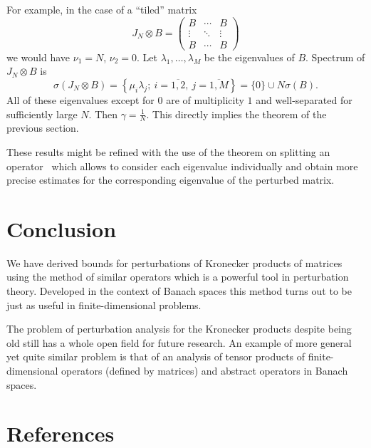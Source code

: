 \documentclass[a4paper]{jpconf}
\begin{document}
For example, in the case of a ``tiled'' matrix
\[
    J_N{\otimes}B =
    \begin{pmatrix}
        B & \cdots & B \\
        \vdots & \ddots & \vdots \\
        B & \cdots & B
    \end{pmatrix}
\]
    we would have
    \( \nu_1=N \),
    \( \nu_2=0 \).
Let \( \lambda_1,\ldots,\lambda_M \)
    be the eigenvalues of \( B \).
Spectrum of \( J_N{\otimes}B \) is
    \[
        \sigma(J_N{\otimes}B) = \left\{ \mu_i\lambda_j;\ i{=}\overline{1,2},\ j{=}\overline{1,M}\right\} = \{0\}\cup N\sigma(B).
    \]
All of these eigenvalues except for \( 0 \)
    are of multiplicity \( 1 \)
    and well-separated for sufficiently large \( N \).
Then \( \gamma=\frac1N \).
This directly implies the theorem of the previous section.

These results might be refined
    with the use of the theorem on splitting an operator~\cite{baskakov1987theorem}
    which allows to consider each eigenvalue individually
    and obtain more precise estimates for the corresponding
    eigenvalue of the perturbed matrix.
    

\section*{Conclusion}

We have derived bounds
    for perturbations of Kronecker products
    of matrices using the method of similar operators
    which is a powerful tool in perturbation theory.
Developed in the context of Banach spaces
    this method turns out to be just as useful
    in finite-dimensional problems.

The problem of perturbation analysis for the Kronecker products
    despite being old still has a whole open field for future research.
An example of more general yet quite similar problem
    is that of an analysis of tensor products
    of finite-dimensional operators (defined by matrices)
    and abstract operators in Banach spaces.

\section*{References}

{}
\end{document}
